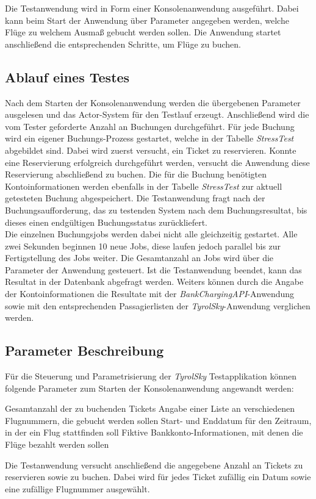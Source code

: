 Die Testanwendung wird in Form einer Konsolenanwendung ausgeführt. Dabei kann beim Start der Anwendung über Parameter angegeben werden, welche Flüge zu welchem Ausmaß gebucht werden sollen. Die Anwendung startet anschließend die entsprechenden Schritte, um Flüge zu buchen. 

\subsection{Ablauf eines Testes}
Nach dem Starten der Konsolenanwendung werden die übergebenen Parameter ausgelesen und das Actor-System für den Testlauf erzeugt. Anschließend wird die vom Tester geforderte Anzahl an Buchungen durchgeführt. Für jede Buchung wird ein eigener Buchungs-Prozess gestartet, welche in der Tabelle \textit{StressTest} abgebildet sind. Dabei wird zuerst versucht, ein Ticket zu reservieren. Konnte eine Reservierung erfolgreich durchgeführt werden, versucht die Anwendung diese Reservierung abschließend zu buchen.
Die für die Buchung benötigten Kontoinformationen werden ebenfalls in der Tabelle \textit{StressTest} zur aktuell getesteten Buchung abgespeichert. Die Testanwendung fragt nach der Buchungsaufforderung, das zu testenden System nach dem Buchungsresultat, bis dieses einen endgültigen Buchungsstatus zurückliefert. \\
Die einzelnen Buchungsjobs werden dabei nicht alle gleichzeitig gestartet. Alle zwei Sekunden beginnen 10 neue Jobs, diese laufen jedoch parallel bis zur Fertigstellung des Jobs weiter. Die Gesamtanzahl an Jobs wird über die Parameter der Anwendung gesteuert. Ist die Testanwendung beendet, kann das Resultat in der Datenbank abgefragt werden. Weiters können durch die Angabe der Kontoinformationen die Resultate mit der \textit{BankChargingAPI}-Anwendung sowie mit den entsprechenden Passagierlisten der \textit{TyrolSky}-Anwendung verglichen werden.

\subsection{Parameter Beschreibung}
Für die Steuerung und Parametrisierung der \textit{TyrolSky} Testapplikation können folgende Parameter zum Starten der Konsolenanwendung angewandt werden:

\begin{itemize}
   Gesamtanzahl der zu buchenden Tickets
   Angabe einer Liste an verschiedenen Flugnummern, die gebucht werden sollen
   Start- und Enddatum für den Zeitraum, in der ein Flug stattfinden soll
   Fiktive Bankkonto-Informationen, mit denen die Flüge bezahlt werden sollen
\end{itemize}
Die Testanwendung versucht anschließend die angegebene Anzahl an Tickets zu reservieren sowie zu buchen. Dabei wird für jedes Ticket zufällig ein Datum sowie eine zufällige Flugnummer ausgewählt. 
